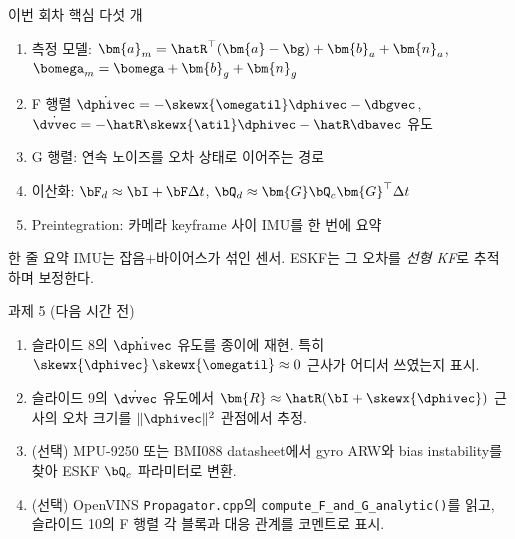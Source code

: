 \begin{frame}{이번 회차 핵심 다섯 개}
  \begin{enumerate}
    \item 측정 모델: $\bm{a}_m = \hatR^\top(\bm{a}-\bg)+\bm{b}_a+\bm{n}_a$, \;$\bomega_m = \bomega+\bm{b}_g+\bm{n}_g$
    \item F 행렬 $\dot{\dphivec} = -\skewx{\omegatil}\dphivec - \dbgvec$,
          $\dot{\dvvec} = -\hatR\skewx{\atil}\dphivec - \hatR\dbavec$ 유도
    \item G 행렬: 연속 노이즈를 오차 상태로 이어주는 경로
    \item 이산화: $\bF_d \approx \bI + \bF\Delta t$, $\bQ_d \approx \bm{G}\bQ_c\bm{G}^\top\Delta t$
    \item Preintegration: 카메라 keyframe 사이 IMU를 한 번에 요약
  \end{enumerate}
  \vspace{0.3em}
  \begin{block}{한 줄 요약}
    IMU는 잡음+바이어스가 섞인 센서. ESKF는 그 오차를 \emph{선형 KF}로 추적하며 보정한다.
  \end{block}
\end{frame}

\begin{frame}{과제 5 (다음 시간 전)}
  \begin{enumerate}
    \item 슬라이드 8의 $\dot{\dphivec}$ 유도를 종이에 재현. 특히
          $\skewx{\dphivec}\,\skewx{\omegatil} \approx 0$ 근사가 어디서 쓰였는지 표시.
    \item 슬라이드 9의 $\dot{\dvvec}$ 유도에서 $\bm{R} \approx \hatR(\bI+\skewx{\dphivec})$
          근사의 오차 크기를 $\|\dphivec\|^2$ 관점에서 추정.
    \item (선택) MPU-9250 또는 BMI088 datasheet에서 gyro ARW와 bias instability를 찾아
          ESKF $\bQ_c$ 파라미터로 변환.
    \item (선택) OpenVINS \texttt{Propagator.cpp}의 \texttt{compute\_F\_and\_G\_analytic()}를
          읽고, 슬라이드 10의 F 행렬 각 블록과 대응 관계를 코멘트로 표시.
  \end{enumerate}
\end{frame}

